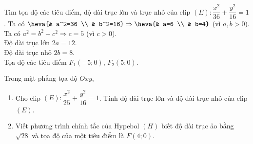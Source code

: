 \begin{bt}%
	Tìm tọa độ các tiêu điểm, độ dài trục lớn và trục nhỏ của elip $(E)\colon \dfrac{x^2}{36}+\dfrac{y^2}{16}=1$.
	\loigiai
	{
		Ta có $\heva{& a^2=36 \\ & b^2=16}\Rightarrow \heva{& a=6 \\ & b=4}$ (vì $a,b>0$).\\
		Ta có $a^2=b^2+c^2\Rightarrow c=5$ (vì $c>0$).\\
		Độ dài trục lớn $2a=12$.\\
		Độ dài trục nhỏ $2b=8$.\\
		Tọa độ các tiêu điểm $F_1(-5;0)$, $F_2(5;0)$.
	}
\end{bt}

\begin{bt}%
	Trong mặt phẳng tọa độ $Oxy$,
	\begin{enumerate}
		\item Cho elip $(E) \colon \dfrac{x^2}{25}+\dfrac{y^2}{16}=1$. Tính độ dài trục lớn và độ dài trục nhỏ của elip $(E)$.
		\item Viết phương trình chính tắc của Hypebol $(H)$ biết độ dài trục ảo bằng $\sqrt{28}$ và tọa độ của một tiêu điểm là $F(4;0)$.
	\end{enumerate}
\end{bt}


